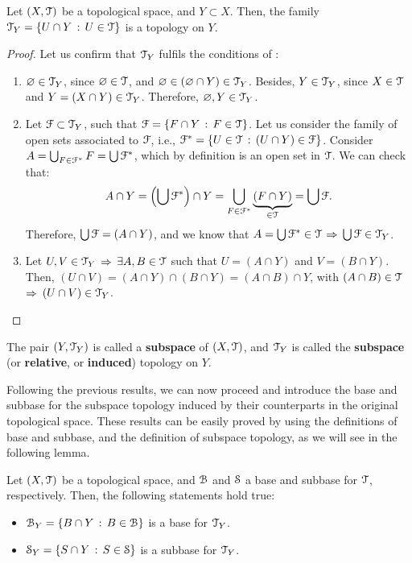 \begin{theorem}
	\label{th:subspace-topology}
	Let $(X, \T)$ be a topological space, and $Y\subset X$. Then, the family
	$\T_Y = \setdef{U\cap Y}{U\in\T}$ is a topology on $Y$.
\end{theorem}
\begin{proof}
Let us confirm that $\T_{Y}$ fulfils the conditions of :
	\begin{enumerate}
		\item $\emptyset\in\T_Y$, since $\emptyset\in\T$, and $\emptyset\in(\emptyset\cap Y)\in \T_Y$. Besides,
		$Y\in \T_Y$, since $X\in\T$ and $Y=(X\cap Y)\in \T_Y$. Therefore, $\emptyset, Y\in \T_Y$.
		\item Let $\F\subset \T_Y$, such that $\F=\setdef{F\cap Y}{F\in \T}$. Let us consider the family of
		open sets associated to $\F$, i.e., $\F^*=\setdef{U\in\T}{(U\cap Y)\in \F}$. Consider
		$A=\bigcup_{F\in\F^*}F=\bigcup \F^*$, which by definition is an open set in $\T$.
		We can check that:
		$$
		A\cap Y = \left(\bigcup\F^*\right)\cap Y=\bigcup_{F\in \F^*}\underbrace{(F\cap Y)}_{\in\T}=\bigcup \F.
		$$
		Therefore, $\bigcup \F = (A\cap Y)$, and we know that $A=\bigcup \F^* \in \T$ $\Then$ $\bigcup \F\in \T_Y$.
		\item Let $U, V\in \T_Y$ $\Then$ $\exists A, B\in \T$ such that $U=(A\cap Y)$ and $V=(B\cap Y)$. Then,
		$(U\cap V) = (A\cap Y)\cap(B\cap Y) = (A\cap B)\cap Y$, with $(A\cap B)\in \T$ $\Then$ $(U\cap V)\in \T_Y$.
	\end{enumerate}
\end{proof}


\begin{definition}
	\label{def:subspace-topology}
	The pair $(Y, \T_Y)$ is called a \textbf{subspace} of $(X, \T)$,
	and $\T_Y$ is called the \textbf{subspace} (or \textbf{relative}, or \textbf{induced}) {topology} on $Y$.
\end{definition}

Following the previous results, we can now proceed and introduce the base and subbase
for the subspace topology induced by their counterparts in the original topological space.
These results can be easily proved by using the definitions of base and subbase, and
the definition of subspace topology, as we will see in the following lemma.

\begin{lemma}
	\label{lem:subspace-topology-base}
	Let $(X, \T)$ be a topological space, and $\B$ and $\S$ a base and subbase for $\T$, respectively.
	Then, the following statements hold true:
	\begin{itemize}
		\item $\B_Y=\setdef{B\cap Y}{B\in\B}$ is a base for $\T_Y$.
		\item $\S_Y=\setdef{S\cap Y}{S\in\S}$ is a subbase for $\T_Y$.
	\end{itemize}
\end{lemma}

